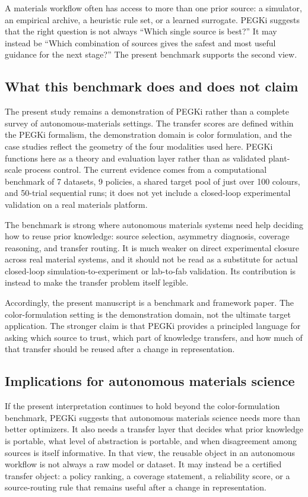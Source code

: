 \documentclass[twoside,twocolumn,9pt]{article}
\begin{document}
A materials workflow often has access to more than one prior source: a simulator, an empirical archive, a heuristic rule set, or a learned surrogate. PEGKi suggests that the right question is not always ``Which single source is best?'' It may instead be ``Which combination of sources gives the safest and most useful guidance for the next stage?'' The present benchmark supports the second view.

\subsection{What this benchmark does and does not claim}

The present study remains a demonstration of PEGKi rather than a complete survey of autonomous-materials settings. The transfer scores are defined within the PEGKi formalism, the demonstration domain is color formulation, and the case studies reflect the geometry of the four modalities used here. PEGKi functions here as a theory and evaluation layer rather than as validated plant-scale process control. The current evidence comes from a computational benchmark of 7 datasets, 9 policies, a shared target pool of just over 100 colours, and 50-trial sequential runs; it does not yet include a closed-loop experimental validation on a real materials platform.

The benchmark is strong where autonomous materials systems need help deciding how to reuse prior knowledge: source selection, asymmetry diagnosis, coverage reasoning, and transfer routing. It is much weaker on direct experimental closure across real material systems, and it should not be read as a substitute for actual closed-loop simulation-to-experiment or lab-to-fab validation. Its contribution is instead to make the transfer problem itself legible.

Accordingly, the present manuscript is a benchmark and framework paper. The color-formulation setting is the demonstration domain, not the ultimate target application. The stronger claim is that PEGKi provides a principled language for asking which source to trust, which part of knowledge transfers, and how much of that transfer should be reused after a change in representation.

\subsection{Implications for autonomous materials science}

If the present interpretation continues to hold beyond the color-formulation benchmark, PEGKi suggests that autonomous materials science needs more than better optimizers. It also needs a transfer layer that decides what prior knowledge is portable, what level of abstraction is portable, and when disagreement among sources is itself informative. In that view, the reusable object in an autonomous workflow is not always a raw model or dataset. It may instead be a certified transfer object: a policy ranking, a coverage statement, a reliability score, or a source-routing rule that remains useful after a change in representation.\cite{Ottomano2024DataAggregation,Lejaeghere2016Reproducibility,Yoshida2025NetworkedAutonomous}
\end{document}
